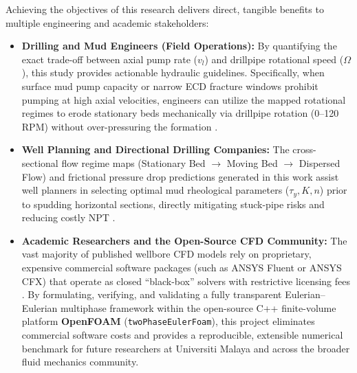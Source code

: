 Achieving the objectives of this research delivers direct, tangible benefits to multiple engineering and academic stakeholders:
\begin{itemize}
    \item \textbf{Drilling and Mud Engineers (Field Operations):} By quantifying the exact trade-off between axial pump rate ($v_l$) and drillpipe rotational speed ($\Omega$), this study provides actionable hydraulic guidelines. Specifically, when surface mud pump capacity or narrow ECD fracture windows prohibit pumping at high axial velocities, engineers can utilize the mapped rotational regimes to erode stationary beds mechanically via drillpipe rotation (0--120 RPM) without over-pressuring the formation \citep{Shehab2015, Khaled2020, Li2026}.
    \item \textbf{Well Planning and Directional Drilling Companies:} The cross-sectional flow regime maps (Stationary Bed $\rightarrow$ Moving Bed $\rightarrow$ Dispersed Flow) and frictional pressure drop predictions generated in this work assist well planners in selecting optimal mud rheological parameters ($\tau_y, K, n$) prior to spudding horizontal sections, directly mitigating stuck-pipe risks and reducing costly NPT \citep{Hajipour2020, Saad2024}.
    \item \textbf{Academic Researchers and the Open-Source CFD Community:} The vast majority of published wellbore CFD models rely on proprietary, expensive commercial software packages (such as ANSYS Fluent or ANSYS CFX) that operate as closed ``black-box'' solvers with restrictive licensing fees \citep{Shehab2015, Hajipour2020, Sorgun2010}. By formulating, verifying, and validating a fully transparent Eulerian--Eulerian multiphase framework within the open-source C++ finite-volume platform \textbf{OpenFOAM} (\texttt{twoPhaseEulerFoam}), this project eliminates commercial software costs and provides a reproducible, extensible numerical benchmark for future researchers at Universiti Malaya and across the broader fluid mechanics community.
\end{itemize}

